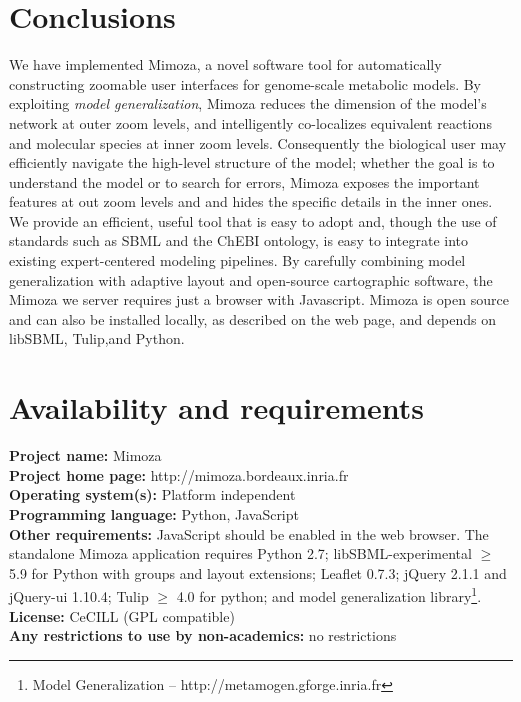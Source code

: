 \documentclass{bmcart}
\begin{document}

\section*{Conclusions}
We have implemented Mimoza, a novel software tool for automatically constructing zoomable
user interfaces for genome-scale metabolic models. 
By exploiting \emph{model generalization}, Mimoza reduces
the dimension of the model's network at outer zoom levels, and intelligently co-localizes
equivalent reactions and molecular species at inner zoom levels.
Consequently the biological user may efficiently navigate the high-level structure of the
model; whether the goal is to understand the model or to search for errors, Mimoza exposes
the important features at out zoom levels and and hides the specific details in the inner
ones.
We provide an efficient, useful  tool that is easy to adopt and, though the use of
standards such as SBML and the ChEBI ontology, is easy to integrate into existing
expert-centered modeling pipelines.
By carefully combining model generalization with adaptive layout and open-source
cartographic software, the Mimoza we server requires just a browser with Javascript. 
Mimoza is open source and can also be installed locally, as described on the web page,
and depends on libSBML, Tulip,and Python.

\section*{Availability and requirements}
\textbf{Project name:} Mimoza\\
\textbf{Project home page:} http://mimoza.bordeaux.inria.fr\\
\textbf{Operating system(s):} Platform independent\\
\textbf{Programming language:} Python, JavaScript\\
\textbf{Other requirements:} JavaScript should be enabled in the web browser. The
standalone Mimoza application requires Python 2.7; libSBML-experimental $\geq$ 5.9 for
Python with groups and layout extensions; Leaflet 0.7.3; jQuery 2.1.1 and jQuery-ui
1.10.4; Tulip $\geq$ 4.0 for python; and model generalization library\footnote{Model Generalization -- http://metamogen.gforge.inria.fr}.\\
\textbf{License:} CeCILL (GPL compatible)\\
\textbf{Any restrictions to use by non-academics:} no restrictions
\end{document}
